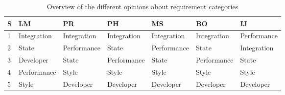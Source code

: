 \begin{table}[h]
    \setlength{\tabcolsep}{4.265pt} %
    \begin{tabularx}{\linewidth}{|l|l|l|l|l|l|l|}
        \hline
        \textbf{S}                              &
        \textbf{LM} \cite{Vogel.2020.Mezzalira} &
        \textbf{PR} \cite{Vogel.2020.Rehm}      &
        \textbf{PH} \cite{Vogel.2020.Huber}     &
        \textbf{MS} \cite{Vogel.2020.Steyer}    &
        \textbf{BO} \cite{Vogel.2020.Olleck}    &
        \textbf{IJ} \cite{Vogel.2020.Jovanovic}
        \\ \hline
        1
                                                &
        Integration
                                                &
        Integration
                                                &
        Integration
                                                &
        Integration
                                                &
        Integration
                                                &
        Performance
        \\ \hline
        2
                                                &
        State
                                                &
        Performance
                                                &
        State
                                                &
        Performance
                                                &
        State
                                                &
        Integration
        \\ \hline
        3
                                                &
        Developer
                                                &
        State
                                                &
        Performance
                                                &
        State
                                                &
        Performance
                                                &
        State
        \\ \hline
        4
                                                &
        Performance
                                                &
        Style
                                                &
        Style
                                                &
        Style
                                                &
        Style
                                                &
        Style
        \\ \hline
        5
                                                &
        Style
                                                &
        Developer
                                                &
        Developer
                                                &
        Developer
                                                &
        Developer
                                                &
        Developer
        \\ \hline
    \end{tabularx}
    \caption{Overview of the different opinions about requirement categories}
    \label{tbl:overview_requirements_categories}
\end{table}

